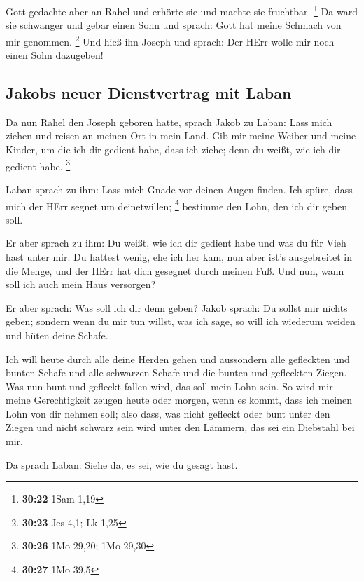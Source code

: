  Gott gedachte aber an Rahel und erhörte sie und machte
sie fruchtbar. \footnote{\textbf{30:22} 1Sam 1,19}  Da
ward sie schwanger und gebar einen Sohn und sprach: Gott hat meine
Schmach von mir genommen. \footnote{\textbf{30:23} Jes 4,1; Lk 1,25}
 Und hieß ihn Joseph und sprach: Der HErr wolle mir noch
einen Sohn dazugeben!

\hypertarget{jakobs-neuer-dienstvertrag-mit-laban}{%
\subsection{Jakobs neuer Dienstvertrag mit
Laban}\label{jakobs-neuer-dienstvertrag-mit-laban}}

 Da nun Rahel den Joseph geboren hatte, sprach Jakob zu
Laban: Lass mich ziehen und reisen an meinen Ort in mein Land.
 Gib mir meine Weiber und meine Kinder, um die ich dir
gedient habe, dass ich ziehe; denn du weißt, wie ich dir gedient habe.
\footnote{\textbf{30:26} 1Mo 29,20; 1Mo 29,30}

 Laban sprach zu ihm: Lass mich Gnade vor deinen Augen
finden. Ich spüre, dass mich der HErr segnet um deinetwillen;
\footnote{\textbf{30:27} 1Mo 39,5}  bestimme den Lohn,
den ich dir geben soll.

 Er aber sprach zu ihm: Du weißt, wie ich dir gedient
habe und was du für Vieh hast unter mir.  Du hattest
wenig, ehe ich her kam, nun aber ist's ausgebreitet in die Menge, und
der HErr hat dich gesegnet durch meinen Fuß. Und nun, wann soll ich auch
mein Haus versorgen?

 Er aber sprach: Was soll ich dir denn geben? Jakob
sprach: Du sollst mir nichts geben; sondern wenn du mir tun willst, was
ich sage, so will ich wiederum weiden und hüten deine Schafe.

 Ich will heute durch alle deine Herden gehen und
aussondern alle gefleckten und bunten Schafe und alle schwarzen Schafe
und die bunten und gefleckten Ziegen. Was nun bunt und gefleckt fallen
wird, das soll mein Lohn sein.  So wird mir meine
Gerechtigkeit zeugen heute oder morgen, wenn es kommt, dass ich meinen
Lohn von dir nehmen soll; also dass, was nicht gefleckt oder bunt unter
den Ziegen und nicht schwarz sein wird unter den Lämmern, das sei ein
Diebstahl bei mir.

 Da sprach Laban: Siehe da, es sei, wie du gesagt hast.

